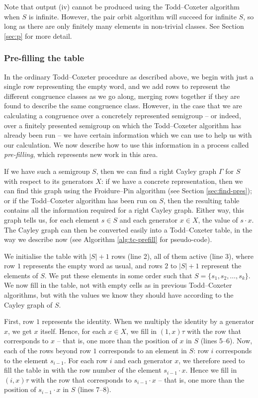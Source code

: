 Note that output (iv) cannot be produced using the Todd--Coxeter algorithm when $S$ is
infinite.  However, the pair orbit algorithm will succeed for infinite $S$, so
long as there are only finitely many elements in non-trivial classes.  See
Section \ref{sec:p} for more detail.

\subsubsection{Pre-filling the table}
\label{sec:tc-prefill}
In the ordinary Todd--Coxeter procedure as described above, we begin with just a
single row representing the empty word, and we add rows to represent the
different congruence classes as we go along, merging rows together if they are
found to describe the same congruence class.  However, in the case that we are
calculating a congruence over a concretely represented semigroup -- or indeed, over a finitely
presented semigroup on which the Todd--Coxeter algorithm has already been run -- we have certain
information which we can use to help us with our calculation.
We now describe how to use this information in a process called
\textit{pre-filling}, which represents new work in this area.

If we have such a semigroup $S$, then we can find a right Cayley graph $\Gamma$
for $S$ with respect to its generators $X$: if we have a concrete representation, then we can find
this graph using the Froidure--Pin algorithm (see Section \ref{sec:find-pres});
or if the Todd--Coxeter algorithm has been run on $S$, then the resulting table contains all
the information required for a right Cayley graph.  Either way, this graph tells us, for
each element $s \in S$ and each generator $x \in X$, the value of $s \cdot x$.
The Cayley graph can then be converted easily into a Todd--Coxeter table, in the
way we describe now (see Algorithm \ref{alg:tc-prefill} for pseudo-code).

We initialise the table with $|S| + 1$ rows (line 2), all of them active (line
3), where row $1$ represents the empty word as usual, and rows $2$ to $|S| + 1$
represent the elements of $S$.  We put these elements in some order such that
$S = \{s_1, s_2, \ldots, s_k\}$.  We now fill in the table, not with empty cells
as in previous Todd--Coxeter algorithms, but with the values we know they should
have according to the Cayley graph of $S$.

First, row $1$ represents the identity.  When we multiply the identity by a
generator $x$, we get $x$ itself.  Hence, for each $x \in X$, we fill in
$(1, x)\tau$ with the row that corresponds to $x$ -- that is, one more than the
position of $x$ in $S$ (lines 5--6).  Now, each of the rows beyond row $1$
corresponds to an element in $S$: row $i$ corresponds to the element $s_{i-1}$.
For each row $i$ and each generator $x$, we therefore need to fill the table in
with the row number of the element $s_{i-1} \cdot x$.  Hence we fill in
$(i, x)\tau$ with the row that corresponds to $s_{i-1} \cdot x$ -- that is, one
more than the position of $s_{i-1} \cdot x$ in $S$ (lines 7--8).

